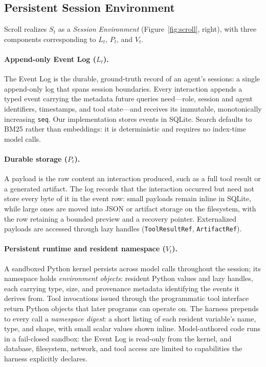 \subsection{Persistent Session Environment}
\label{sec:session-environment}

Scroll realizes $S_t$ as a \emph{Session Environment} (Figure~\ref{fig:scroll}, right), with three components corresponding to $L_t$, $P_t$, and $V_t$.

\paragraph{Append-only Event Log ($L_t$).}
The Event Log is the durable, ground-truth record of an agent's sessions: a single append-only log that spans session boundaries. Every interaction appends a typed event carrying the metadata future queries need---role, session and agent identifiers, timestamps, and tool state---and receives its immutable, monotonically increasing \texttt{seq}. Our implementation stores events in SQLite. Search defaults to BM25 rather than embeddings: it is deterministic and requires no index-time model calls. 

\paragraph{Durable storage ($P_t$).}
A payload is the raw content an interaction produced, such as a full tool result or a generated artifact. The log records that the interaction occurred but need not store every byte of it in the event row: small payloads remain inline in SQLite, while large ones are moved into JSON or artifact storage on the filesystem, with the row retaining a bounded preview and a recovery pointer. Externalized payloads are accessed through lazy handles (\texttt{ToolResultRef}, \texttt{ArtifactRef}).

\paragraph{Persistent runtime and resident namespace ($V_t$).}
A sandboxed Python kernel persists across model calls throughout the session; its namespace holds \emph{environment objects}: resident Python values and lazy handles, each carrying type, size, and provenance metadata identifying the events it derives from. 
Tool invocations issued through the programmatic tool interface~\citep{ptc} return Python objects that later programs can operate on.
The harness prepends to every call a \emph{namespace digest}: a short listing of each resident variable's name, type, and shape, with small scalar values shown inline. Model-authored code runs in a fail-closed sandbox: the Event Log is read-only from the kernel, and database, filesystem, network, and tool access are limited to capabilities the harness explicitly declares.

